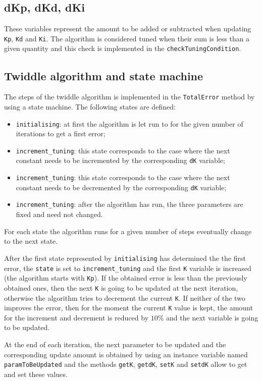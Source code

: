 \documentclass{article}
\let\cd\lstinline
\begin{document}
\subsection{dKp, dKd, dKi}
These variables represent the amount to be added or subtracted when updating \cd+Kp+, \cd+Kd+ and \cd+Ki+. The algorithm is considered tuned when their sum is less than a given quantity and this check is implemented in the \cd+checkTuningCondition+.

\subsection{Twiddle algorithm and state machine}
The steps of the twiddle algorithm is implemented in the \cd+TotalError+ method by using a state machine. The following states are defined:
\begin{itemize}
\item \cd+initialising+: at first the algorithm is let run to for the given number of iterations to get a first error;
\item \cd+increment_tuning+: this state corresponds to the case where the next constant needs to be incremented by the corresponding \cd+dK+ variable;
\item \cd+increment_tuning+: this state corresponds to the case where the next constant needs to be decremented by the corresponding \cd+dK+ variable;
\item \cd+increment_tuning+: after the algorithm has run, the three parameters are fixed and need not changed.
\end{itemize}
For each state the algorithm runs for a given number of steps eventually change to the next state.

After the first state represented by \cd+initialising+ has determined the the first error, the \cd+state+ is set to \cd+increment_tuning+ and the first \cd+K+ variable is increased (the algorithm starts with \cd+Kp+). If the obtained error is less than the previously obtained ones, then the next \cd+K+ is going to be updated at the next iteration, otherwise the algorithm tries to decrement the current \cd+K+. If neither of the two improves the error, then for the moment the current \cd+K+ value is kept, the amount for the increment and decrement is reduced by $10\%$ and the next variable is going to be updated.

At the end of each iteration, the next parameter to be updated and the corresponding update amount is obtained by using an instance variable named \cd+paramToBeUpdated+ and the methods \cd+getK+, \cd+getdK+, \cd+setK+ and \cd+setdK+ allow to get and set these values.
\end{document}
